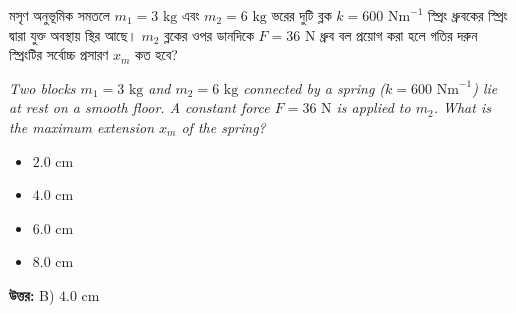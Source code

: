 \documentclass[12pt, a4paper]{article}
\begin{document}
\vspace{2em}

\begin{tcolorbox}[questionbox={প্রশ্ন (Question) 3}]
\noindent
মসৃণ অনুভূমিক সমতলে $m_1 = 3\text{ kg}$ এবং $m_2 = 6\text{ kg}$ ভরের দুটি ব্লক $k = 600\text{ Nm}^{-1}$ স্প্রিং ধ্রুবকের স্প্রিং দ্বারা যুক্ত অবস্থায় স্থির আছে। $m_2$ ব্লকের ওপর ডানদিকে $F = 36\text{ N}$ ধ্রুব বল প্রয়োগ করা হলে গতির দরুন স্প্রিংটির সর্বোচ্চ প্রসারণ $x_m$ কত হবে?
\vspace{0.8em}
\begin{english}
\noindent\textit{\color{darkgray}
Two blocks $m_1 = 3\text{ kg}$ and $m_2 = 6\text{ kg}$ connected by a spring ($k = 600\text{ Nm}^{-1}$) lie at rest on a smooth floor. A constant force $F = 36\text{ N}$ is applied to $m_2$. What is the maximum extension $x_m$ of the spring?
}
\end{english}
\end{tcolorbox}

\begin{itemize}[label={}, leftmargin=1cm, itemsep=0.5em]
\item[\textbf{A)}] $2.0\text{ cm}$
\item[\textbf{B)}] $4.0\text{ cm}$
\item[\textbf{C)}] $6.0\text{ cm}$
\item[\textbf{D)}] $8.0\text{ cm}$
\end{itemize}
\vspace{0.5em}

\begin{tcolorbox}[answerbox]
\textbf{\color{success} উত্তর:} B) $4.0\text{ cm}$
\end{tcolorbox}
\vspace{1em}
\end{document}
